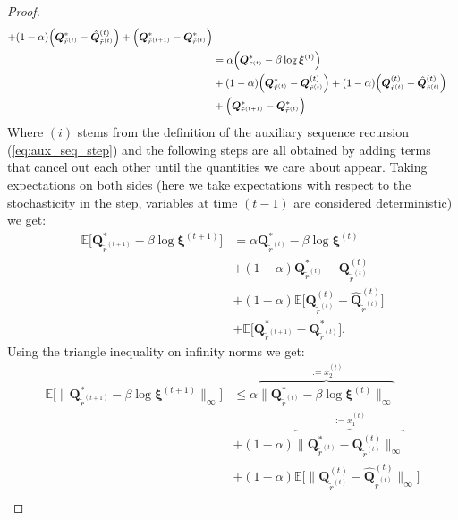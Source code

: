 \begin{proof}
\begin{align*}
    + (1-\alpha) \Big( \bm{Q}_{\tilde{r}^{(t)}}^*   - \hat{\bm{Q}}^{(t)}_{\tilde{r}^{(t)}}  \Big)
    + \Bigl(\bm{Q}_{\tilde{r}^{(t+1)}}^*  - \bm{Q}_{\tilde{r}^{(t)}}^*  \Bigr)\\
    &= \alpha \Big( \bm{Q}_{\tilde{r}^{(t)}}^* 
    -  \beta \log \bm{\xi}^{(t)}  \Big) \\ &
    + (1-\alpha) \Big( \bm{Q}_{\tilde{r}^{(t)}}^* - \bm{Q}_{\tilde{r}^{(t)}}^{(t)} \Big) 
    + (1-\alpha) \Big( 
    \bm{Q}_{\tilde{r}^{(t)}}^{(t)}
    - \hat{\bm{Q}}^{(t)}_{\tilde{r}^{(t)}}  \Big) \\ &
    + \Bigl(\bm{Q}_{\tilde{r}^{(t+1)}}^*  - \bm{Q}_{\tilde{r}^{(t)}}^*  \Bigr)
\end{align*}
Where $(i)$ stems from the definition of the auxiliary sequence recursion (\ref{eq:aux_seq_step}) and the following steps are all obtained by adding terms that cancel out each other until the quantities we care about appear. Taking expectations on both sides (here we take expectations with respect to the stochasticity in the step, variables at time  $(t-1)$ are considered deterministic) we get:
\begin{align*}
    \mathbb{E}\Big[
    \bm{Q}_{\tilde{r}^{(t+1)}}^* - \beta \log \bm{\xi}^{(t+1)} 
    \Big]
    & = \alpha  \bm{Q}_{\tilde{r}^{(t)}}^* - \beta \log \bm{\xi}^{(t)} 
    \\
    &+ (1-\alpha)
    \bm{Q}_{\tilde{r}^{(t)}}^*  
    - {\bm{Q}}^{(t)}_{\tilde{r}^{(t)}} 
    \\ 
    &+ (1-\alpha) \mathbb{E}\Big[
        {\bm{Q}}^{(t)}_{\tilde{r}^{(t)}} 
        - \hat{\bm{Q}}^{(t)}_{\tilde{r}^{(t)}} \Big]
    \\
    &+ \mathbb{E}\Big[
        \bm{Q}_{\tilde{r}^{(t+1)}}^*  
        - \bm{Q}_{\tilde{r}^{(t)}}^* \Big].
\end{align*}
Using the triangle inequality on infinity norms we get:
\begin{align*}
    \mathbb{E}\Big[ \| \bm{Q}_{\tilde{r}^{(t+1)}}^* - \beta \log \bm{\xi}^{(t+1)} \|_\infty \Big]
    & \leq \alpha  \overbrace{\| \bm{Q}_{\tilde{r}^{(t)}}^* - \beta \log \bm{\xi}^{(t)} \|_\infty }^{:=x_2^{(t)}}
    \\
    &+ (1-\alpha) \overbrace{\|
    \bm{Q}_{\tilde{r}^{(t)}}^*  
    - {\bm{Q}}^{(t)}_{\tilde{r}^{(t)}} 
    \|_\infty  }^{:=x_1^{(t)}}
    \\ 
    &+ (1-\alpha) \mathbb{E}\Big[ \|
        {\bm{Q}}^{(t)}_{\tilde{r}^{(t)}} 
        - \hat{\bm{Q}}^{(t)}_{\tilde{r}^{(t)}} 
    \|_\infty \Big]
    \\

\end{align*}
\end{proof}
